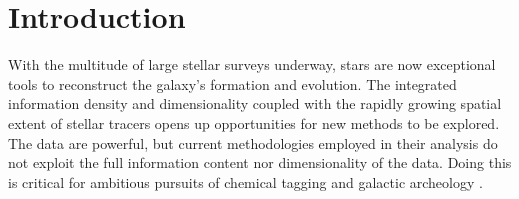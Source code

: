 \documentclass[12pt, preprint]{aastex}
\newcommand{\project}[1]{\textsl{#1}}
\newcommand{\tc}{\project{The~Cannon}}
\begin{document}

\section{}
%
%


\section{Introduction}\label{sec:Intro}

With the multitude of large stellar surveys underway, stars are now exceptional tools to reconstruct the galaxy's formation and evolution. 
The integrated information density and dimensionality coupled with the rapidly growing spatial extent of stellar tracers opens up opportunities for new methods to be explored. The data are powerful, but current methodologies employed in their analysis do not exploit the full information content nor dimensionality of the data. Doing this is critical for ambitious pursuits of chemical tagging \citep[e.g.][]{Ting2015} and galactic archeology \citep{Freeman2002, Martell2015}. 
\end{document}
